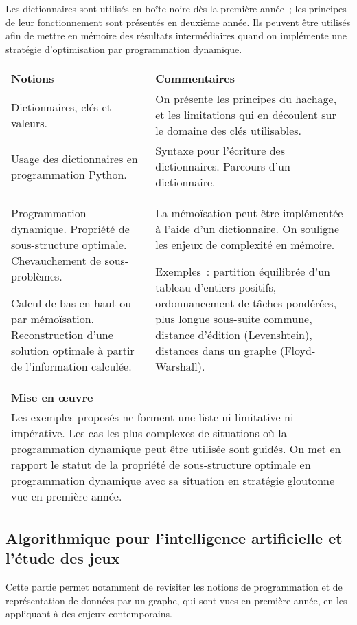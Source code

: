 Les dictionnaires sont utilisés en boîte noire dès la première année~; les principes de leur fonctionnement sont présentés en deuxième année. Ils peuvent être utilisés afin de mettre en mémoire des résultats intermédiaires quand on implémente une stratégie d'optimisation par programmation dynamique. 

\begin{longtable}{|p{\lnotion}|p{\comment}|}
    \hline
    \textbf{Notions} & \textbf{Commentaires} \\
    \hline \hline
	Dictionnaires, clés et valeurs.&
	On présente les principes du hachage, et les limitations qui en découlent sur le domaine des clés utilisables. \\ \hline
	Usage des dictionnaires en programmation Python.&
	Syntaxe pour l'écriture des dictionnaires.	
	Parcours d'un dictionnaire. \\ \hline
	Programmation dynamique. Propriété de sous-structure optimale. Chevauchement de sous-problèmes. 
	
	Calcul de bas en haut ou par mémoïsation. Reconstruction d'une solution optimale à partir de l'information calculée.
    &
    La mémoïsation peut être implémentée à l'aide d'un dictionnaire.
    On souligne les enjeux de complexité en mémoire. 
    
    Exemples~: partition équilibrée d'un tableau d'entiers positifs, ordonnancement de tâches pondérées, plus longue sous-suite commune, distance d'édition (Levenshtein), distances dans un graphe (Floyd-Warshall).\\
	\hline \hline
    \multicolumn{2}{|p{\lmoe}|}{\textbf{Mise en \oe uvre}} \\
    \hline 
    \multicolumn{2}{|p{\lmoe}|}{
Les exemples proposés ne forment une liste ni limitative ni impérative. Les cas les plus complexes de situations où la programmation dynamique peut être utilisée sont guidés.
On met en rapport le statut de la propriété de sous-structure optimale en programmation dynamique avec sa situation en stratégie gloutonne vue en première année.
        } \\
        \hline 
\end{longtable}


\subsection{Algorithmique pour l'intelligence artificielle et l'étude des jeux}

Cette partie permet notamment de revisiter les notions de programmation et de représentation de données par un graphe, qui sont vues en première année, en les appliquant à des enjeux contemporains.

